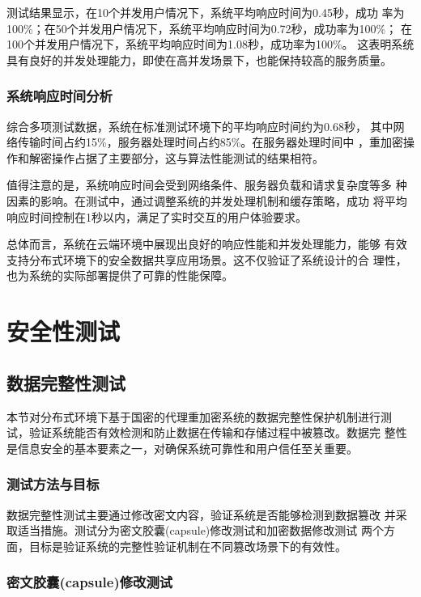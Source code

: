 测试结果显示，在10个并发用户情况下，系统平均响应时间为0.45秒，成功
率为100\%；在50个并发用户情况下，系统平均响应时间为0.72秒，成功率为100\%；
在100个并发用户情况下，系统平均响应时间为1.08秒，成功率为100\%。
这表明系统具有良好的并发处理能力，即使在高并发场景下，也能保持较高的服务质量。

\subsubsection{系统响应时间分析}

综合多项测试数据，系统在标准测试环境下的平均响应时间约为0.68秒，
其中网络传输时间占约15\%，服务器处理时间占约85\%。在服务器处理时间中
，重加密操作和解密操作占据了主要部分，这与算法性能测试的结果相符。

值得注意的是，系统响应时间会受到网络条件、服务器负载和请求复杂度等多
种因素的影响。在测试中，通过调整系统的并发处理机制和缓存策略，成功
将平均响应时间控制在1秒以内，满足了实时交互的用户体验要求。

总体而言，系统在云端环境中展现出良好的响应性能和并发处理能力，能够
有效支持分布式环境下的安全数据共享应用场景。这不仅验证了系统设计的合
理性，也为系统的实际部署提供了可靠的性能保障。

\section{安全性测试}

\subsection{数据完整性测试}

本节对分布式环境下基于国密的代理重加密系统的数据完整性保护机制进行测
试，验证系统能否有效检测和防止数据在传输和存储过程中被篡改。数据完
整性是信息安全的基本要素之一，对确保系统可靠性和用户信任至关重要。

\subsubsection{测试方法与目标}

数据完整性测试主要通过修改密文内容，验证系统是否能够检测到数据篡改
并采取适当措施。测试分为密文胶囊(capsule)修改测试和加密数据修改测试
两个方面，目标是验证系统的完整性验证机制在不同篡改场景下的有效性。

\subsubsection{密文胶囊(capsule)修改测试}

